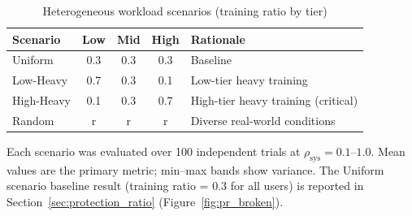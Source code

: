 \begin{table}[tb]
\centering
\caption{Heterogeneous workload scenarios (training ratio by tier)}
\label{tab:hetero_scenarios}
\begin{tabular}{lcccp{3.8cm}}
\hline
Scenario   & Low & Mid & High & Rationale \\ \hline
Uniform    & 0.3 & 0.3 & 0.3  & Baseline \\
Low-Heavy  & 0.7 & 0.3 & 0.1  & Low-tier heavy training \\
High-Heavy & 0.1 & 0.3 & 0.7  & High-tier heavy training (critical) \\
Random     & r   & r   & r    & Diverse real-world conditions \\ \hline
\end{tabular}
\end{table}


Each scenario was evaluated over 100 independent trials
at $\rho_\mathrm{sys} = 0.1$--$1.0$.
Mean values are the primary metric; min--max bands show variance.
The Uniform scenario baseline result (training ratio = 0.3 for all users)
is reported in Section~\ref{sec:protection_ratio} (Figure~\ref{fig:pr_broken}).



